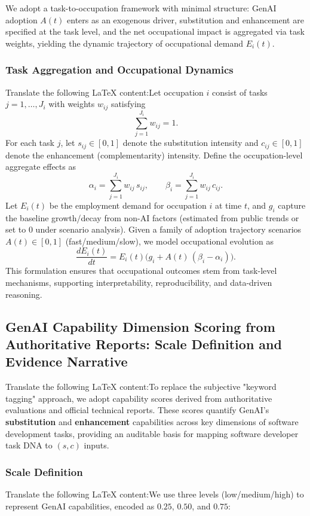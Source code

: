 We adopt a task-to-occupation framework with minimal structure: GenAI adoption $A(t)$ enters as an exogenous driver, substitution and enhancement are specified at the task level, and the net occupational impact is aggregated via task weights, yielding the dynamic trajectory of occupational demand $E_i(t)$.\subsubsection{Task Aggregation and Occupational Dynamics}Translate the following LaTeX content:Let occupation \(i\) consist of tasks \(j=1,\dots,J_i\) with weights \(w_{ij}\) satisfying
\begin{equation}
    \sum_{j=1}^{J_i} w_{ij} = 1.
\end{equation}
For each task \(j\), let \(s_{ij}\in[0,1]\) denote the substitution intensity and \(c_{ij}\in[0,1]\) denote the enhancement (complementarity) intensity.
Define the occupation-level aggregate effects as
\begin{equation}
    \alpha_i=\sum_{j=1}^{J_i} w_{ij}\,s_{ij},\qquad
    \beta_i=\sum_{j=1}^{J_i} w_{ij}\,c_{ij}.
\end{equation}Let $E_i(t)$ be the employment demand for occupation $i$ at time $t$, and $g_i$ capture the baseline growth/decay from non-AI factors (estimated from public trends or set to $0$ under scenario analysis).  
Given a family of adoption trajectory scenarios $A(t) \in [0,1]$ (fast/medium/slow), we model occupational evolution as  
\begin{equation}
    \frac{dE_i(t)}{dt}=E_i(t)\Big(g_i + A(t)\,(\beta_i-\alpha_i)\Big).
\end{equation}
This formulation ensures that occupational outcomes stem from task-level mechanisms, supporting interpretability, reproducibility, and data-driven reasoning.\subsection{GenAI Capability Dimension Scoring from Authoritative Reports: Scale Definition and Evidence Narrative}Translate the following LaTeX content:To replace the subjective "keyword tagging" approach, we adopt capability scores derived from authoritative evaluations and official technical reports.  
These scores quantify GenAI's \textbf{substitution} and \textbf{enhancement} capabilities across key dimensions of software development tasks, providing an auditable basis for mapping software developer task DNA to $(s,c)$ inputs.\subsubsection{Scale Definition}Translate the following LaTeX content:We use three levels (low/medium/high) to represent GenAI capabilities, encoded as $0.25$, $0.50$, and $0.75$:
